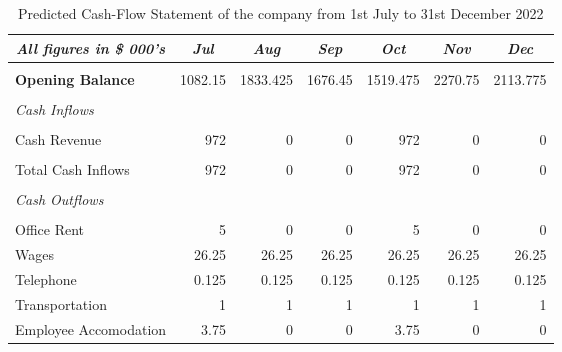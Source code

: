 \begin{table}[htbp]
  \centering
  \caption{Predicted Cash-Flow Statement of the company from 1st July to 31st December 2022}
    \begin{tabular}{|l|r|r|r|r|r|r|}
    \toprule
    \hline
    \hline
    \multicolumn{1}{|c|}{\textit{\textbf{All figures in \$ 000's}}} & \multicolumn{1}{c|}{\textit{\textbf{Jul}}} & \multicolumn{1}{c|}{\textit{\textbf{Aug}}} & \multicolumn{1}{c|}{\textit{\textbf{Sep}}} & \multicolumn{1}{c|}{\textit{\textbf{Oct}}} & \multicolumn{1}{c|}{\textit{\textbf{Nov}}} & \multicolumn{1}{c|}{\textit{\textbf{Dec}}} \\
    \midrule
    \hline
    \hline
          &       &       &       &       &       &  \\
    \midrule
    \textbf{Opening Balance} & 1082.15 & 1833.425 & 1676.45 & 1519.475 & 2270.75 & 2113.775 \\
    \midrule
          &       &       &       &       &       &  \\
    \midrule
    \textit{Cash Inflows} &       &       &       &       &       &  \\
    \midrule
          &       &       &       &       &       &  \\
    \midrule
    Cash Revenue & 972   & 0     & 0     & 972   & 0     & 0 \\
    \midrule
          &       &       &       &       &       &  \\
    \midrule
    Total Cash Inflows & 972   & 0     & 0     & 972   & 0     & 0 \\
    \midrule
          &       &       &       &       &       &  \\
    \midrule
    \textit{Cash Outflows} &       &       &       &       &       &  \\
    \midrule
          &       &       &       &       &       &  \\
    \midrule
    Office Rent  & 5     & 0     & 0     & 5     & 0     & 0 \\
    \midrule
    Wages & 26.25 & 26.25 & 26.25 & 26.25 & 26.25 & 26.25 \\
    \midrule
    Telephone & 0.125 & 0.125 & 0.125 & 0.125 & 0.125 & 0.125 \\
    \midrule
    Transportation & 1     & 1     & 1     & 1     & 1     & 1 \\
    \midrule
    Employee Accomodation & 3.75  & 0     & 0     & 3.75  & 0     & 0 \\

\end{tabular}
\end{table}

